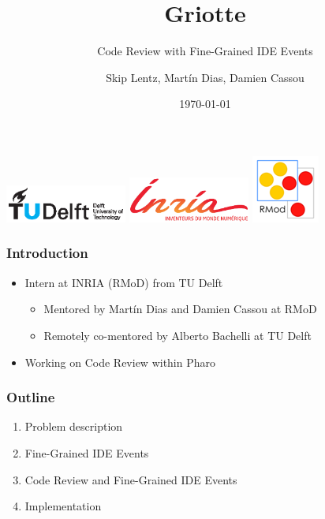 \documentclass[aspectratio=169]{beamer}
\title{Griotte}
\subtitle{Code Review with Fine-Grained IDE Events}
\author{Skip Lentz, Mart\'{i}n Dias, Damien Cassou}
\institute{TU Delft, INRIA Lille - Nord Europe}
\date{\today}
\begin{document}
\begin{frame}

\titlepage
\centering
\includegraphics[width=40mm]{img/tu_delft_logo.eps}
\includegraphics[width=40mm]{img/inria_logo.eps}
\includegraphics{img/rmod_logo.png}

\end{frame}

\begin{frame}[fragile]

\frametitle{Introduction}

\begin{itemize}
\item Intern at INRIA (RMoD) from TU Delft
\begin{itemize}
\item Mentored by Mart\'{i}n Dias and Damien Cassou at RMoD
\item Remotely co-mentored by Alberto Bachelli at TU Delft
\end{itemize}

\item Working on Code Review within Pharo
\end{itemize}
\end{frame}

\begin{frame}[fragile]

\frametitle{Outline}

\begin{enumerate}
\item Problem description
\item Fine-Grained IDE Events
\item Code Review and Fine-Grained IDE Events
\item Implementation
\end{enumerate}
\end{frame}
\end{document}
